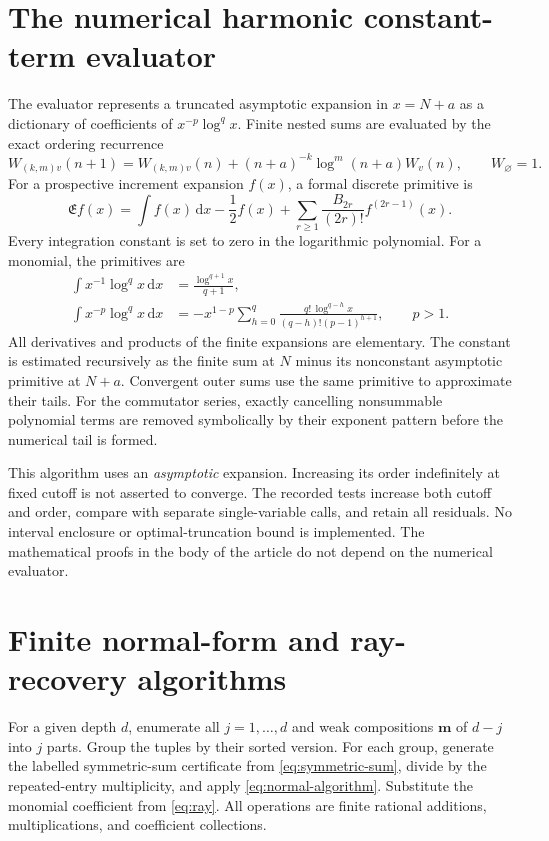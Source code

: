 \documentclass[11pt]{article}
\numberwithin{equation}{section}
\theoremstyle{definition}
\newcommand{\dd}{\,\mathrm d}
\newcommand{\bbm}{\boldsymbol m}
\begin{document}
\section{The numerical harmonic constant-term evaluator}
\label{app:em}
The evaluator represents a truncated asymptotic expansion in
$x=N+a$ as a dictionary of coefficients of $x^{-p}\log^q x$.
Finite nested sums are evaluated by the exact ordering recurrence
\[
 W_{(k,m)v}(n+1)=W_{(k,m)v}(n)+
                  (n+a)^{-k}\log^m(n+a)W_v(n),\qquad W_\varnothing=1.
\]
For a prospective increment expansion $f(x)$, a formal discrete primitive
is
\begin{equation}\label{eq:EM-primitive}
 \mathfrak E f(x)=\int f(x)\dd x-\frac12f(x)
       +\sum_{r\ge1}\frac{B_{2r}}{(2r)!}f^{(2r-1)}(x).
\end{equation}
Every integration constant is set to zero in the logarithmic polynomial.
For a monomial, the primitives are
\begin{align*}
 \int x^{-1}\log^q x\dd x&=\frac{\log^{q+1}x}{q+1},\\
 \int x^{-p}\log^q x\dd x
 &=-x^{1-p}\sum_{h=0}^q
       \frac{q!\,\log^{q-h}x}{(q-h)!(p-1)^{h+1}},\qquad p>1.
\end{align*}
All derivatives and products of the finite expansions are elementary.
The constant is estimated recursively as the finite sum at $N$ minus
its nonconstant asymptotic primitive at $N+a$. Convergent outer sums use
the same primitive to approximate their tails. For the commutator series,
exactly cancelling nonsummable polynomial terms are removed symbolically
by their exponent pattern before the numerical tail is formed.

This algorithm uses an \emph{asymptotic} expansion. Increasing its order
indefinitely at fixed cutoff is not asserted to converge. The recorded
tests increase both cutoff and order, compare with separate single-variable
calls, and retain all residuals. No interval enclosure or optimal-truncation
bound is implemented. The mathematical proofs in the body of the article
do not depend on the numerical evaluator.

\section{Finite normal-form and ray-recovery algorithms}
\label{app:algorithms}
For a given depth $d$, enumerate all $j=1,\ldots,d$ and weak compositions
$\bbm$ of $d-j$ into $j$ parts. Group the tuples by their sorted version.
For each group, generate the labelled symmetric-sum certificate from
\eqref{eq:symmetric-sum}, divide by the repeated-entry multiplicity, and
apply \eqref{eq:normal-algorithm}. Substitute the monomial coefficient
from \eqref{eq:ray}. All operations are finite rational additions,
multiplications, and coefficient collections.
\end{document}
